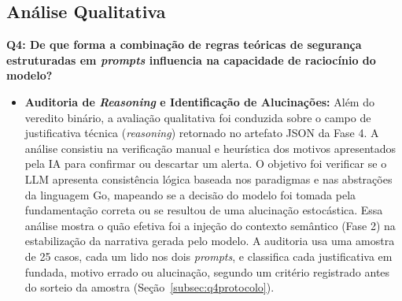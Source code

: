 \subsection{Análise Qualitativa}

\textbf{Q4: De que forma a combinação de regras teóricas de segurança estruturadas em \textit{prompts} influencia na capacidade de raciocínio do modelo?}
\begin{itemize}
    \item \textbf{Auditoria de \textit{Reasoning} e Identificação de Alucinações:} Além do veredito binário, a avaliação qualitativa foi conduzida sobre o campo de justificativa técnica (\textit{reasoning}) retornado no artefato JSON da Fase 4. A análise consistiu na verificação manual e heurística dos motivos apresentados pela IA para confirmar ou descartar um alerta. O objetivo foi verificar se o LLM apresenta consistência lógica baseada nos paradigmas e nas abstrações da linguagem Go, mapeando se a decisão do modelo foi tomada pela fundamentação correta ou se resultou de uma alucinação estocástica. Essa análise mostra o quão efetiva foi a injeção do contexto semântico (Fase 2) na estabilização da narrativa gerada pelo modelo. A auditoria usa uma amostra de 25 casos, cada um lido nos dois \textit{prompts}, e classifica cada justificativa em fundada, motivo errado ou alucinação, segundo um critério registrado antes do sorteio da amostra (Seção~\ref{subsec:q4protocolo}).
\end{itemize}

